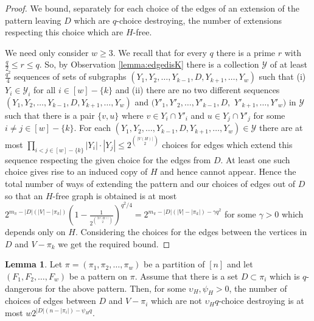 \documentclass[12pt]{article}
\theoremstyle{definition}
\newtheorem{lemma}[theorem]{Lemma}
\newcommand\cY{{\mathcal Y}}
\begin{document}
\begin{proof}
We bound,  separately  for each choice of  the edges of an extension of the pattern leaving $D$ which  
are $q$-choice destroying,  the number of extensions respecting this choice which are $H$-free.   

We need only consider $w\ge 3$. We recall that for every $q$ there is a prime $r$ with $\frac{q}{2} \le r \le q$.
So, by  Observation  \ref{lemma:edgedisK} there is a collection $\cY$ of at least $\frac{q^2}{4}$ sequences of sets of subgraphs $(Y_1,Y_2,\ldots,Y_{k-1},D,Y_{k+1},\ldots, Y_w)$ such that (i) $Y_i\in \cY_i$ for all $ i \in  [w]-\{k\}$ and
(ii)  there are no two different sequences $(Y_1,Y_2,\ldots,Y_{k-1},D,Y_{k+1},\ldots, Y_w)$ and $(Y'_1,Y'_2,\ldots,Y'_{k-1},D,$ $Y'_{k+1},\ldots, Y'_w)$ in $\cY$ such that there is a pair $\{v,u\}$ where $v\in Y_i\cap Y'_i$ and $u\in Y_j\cap Y'_j$ for some $i\neq j\in [w]-\{k\}$. For each $(Y_1,Y_2,\ldots,Y_{k-1},D,Y_{k+1},\ldots, Y_w)\in \cY$ there are at most $\prod_{i<j\in [w]-\{k\}}|Y_i|\cdot |Y_j|\le 2^{\binom{|V(H)|}{2}}$ choices for edges which extend this sequence respecting the given choice 
for the edges from $D$. At least one  such choice gives rise to an induced copy of $H$ and hence cannot appear. Hence the total number of ways of  extending the pattern and our choices of edges out of $D$ so that an $H$-free graph is obtained  is at most  $2^{m_\pi-|D|(|V|-|\pi_k|)}\left(1-\frac{1}{2^{|V(H)| \choose 2}}\right)^{q^2/4}= 2^{m_\pi-|D|(|V|-|\pi_k|)-\gamma  q^2}$ for some $\gamma>0$ which depends only on $H$. Considering the choices for the edges between the vertices in $D$ and $V-\pi_k$ we get the required bound.
\end{proof}




\begin{lemma}\label{dangeroustochoicedestroying}
 Let $\pi=(\pi_1,\pi_2,\ldots,\pi_w)$ be a partition of $[n]$ and let $(F_1,F_2,\ldots,F_w)$ be a pattern on $\pi$. Assume that there is a set $D\subset \pi_i$ which is $q$-dangerous for the above pattern. Then, for some   $\upsilon_H, \psi_H>0$, the number of choices of edges between $D$ and $V-\pi_i$ which are not  $\upsilon_H q  $-choice destroying is at most $w2^{|D|(n-|\pi_i|)-\psi_Hq}$.   
\end{lemma}
\end{document}
